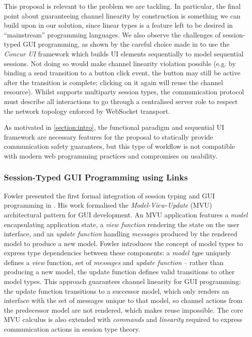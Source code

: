 This proposal is relevant to the problem we are tackling.
In particular, the final point about guaranteeing channel linearity
by construction is something we can build upon in our solution,
since linear types is a feature left to be desired in
``mainstream'' programming languages.
We also observe the challenges of session-typed GUI
programming, as shown by the careful choice 
made in \cite{PureScript2019} 
to use the \textit{Concur UI} framework \cite{ConcurUI} which 
builds UI elements sequentially to model sequential sessions.
Not doing so would make channel linearity violation possible 
(e.g. by binding a send transition to a button click event,
the button may still be active after the transition is complete;
clicking on it again will reuse the channel resource).
Whilst \cite{PureScript2019} supports multiparty session types,
the communication protocol must describe all interactions
to go through a centralised server role to respect the
network topology enforced by WebSocket transport.

As motivated in \cref{section:intro}, 
the functional paradigm and sequential UI framework
are necessary features for the proposal to statically 
provide communication safety guarantees, but 
this type of workflow is not compatible with 
modern web programming practices and compromises on usability.

\subsubsection{Session-Typed GUI Programming using Links}
Fowler presented the first formal integration
of session typing and GUI programming in \cite{MVU2020}.
His work formalised the \textit{Model-View-Update} (MVU)
architectural pattern for GUI development.
An MVU application features a \textit{model} encapsulating application
state, a \textit{view function} rendering the state on the 
user interface, and an
\textit{update function} handling
\textit{messages} produced by the
rendered model to produce a new model.
Fowler introduces the concept of model types
to express type dependencies between these components:
a \emph{model type} uniquely defines a \textit{view} function,
set of \textit{messages} and \textit{update function} --
rather than producing a new model, the update function 
defines valid transitions to other model types.
This approach guarantees channel linearity for GUI programming:
the update function transitions to a successor model, which only
renders an interface with the set of messages unique to that model,
so channel actions from the predecessor model are not rendered,
which makes reuse impossible.
The core MVU calculus is also extended with \textit{commands}
and \textit{linearity} required to express communication
actions in session type theory.

